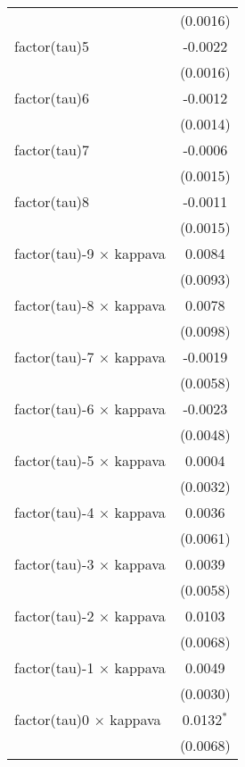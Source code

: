 \begin{tabular}{lc}
                                   & (0.0016)\\   
   factor(tau)5                    & -0.0022\\   
                                   & (0.0016)\\   
   factor(tau)6                    & -0.0012\\   
                                   & (0.0014)\\   
   factor(tau)7                    & -0.0006\\   
                                   & (0.0015)\\   
   factor(tau)8                    & -0.0011\\   
                                   & (0.0015)\\   
   factor(tau)-9 $\times$ kappava  & 0.0084\\   
                                   & (0.0093)\\   
   factor(tau)-8 $\times$ kappava  & 0.0078\\   
                                   & (0.0098)\\   
   factor(tau)-7 $\times$ kappava  & -0.0019\\   
                                   & (0.0058)\\   
   factor(tau)-6 $\times$ kappava  & -0.0023\\   
                                   & (0.0048)\\   
   factor(tau)-5 $\times$ kappava  & 0.0004\\   
                                   & (0.0032)\\   
   factor(tau)-4 $\times$ kappava  & 0.0036\\   
                                   & (0.0061)\\   
   factor(tau)-3 $\times$ kappava  & 0.0039\\   
                                   & (0.0058)\\   
   factor(tau)-2 $\times$ kappava  & 0.0103\\   
                                   & (0.0068)\\   
   factor(tau)-1 $\times$ kappava  & 0.0049\\   
                                   & (0.0030)\\   
   factor(tau)0 $\times$ kappava   & 0.0132$^{*}$\\   
                                   & (0.0068)\\   

\end{tabular}
